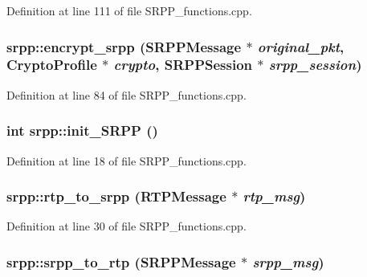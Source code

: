 Definition at line 111 of file SRPP\_\-functions.cpp.

\hypertarget{namespacesrpp_adac1bae57907c468dda2ad2e546199e8}{
\subsubsection[{encrypt\_\-srpp}]{ srpp::encrypt\_\-srpp ({\bf SRPPMessage} $\ast$ {\em original\_\-pkt}, \/  {\bf CryptoProfile} $\ast$ {\em crypto}, \/  {\bf SRPPSession} $\ast$ {\em srpp\_\-session})}}
\label{namespacesrpp_adac1bae57907c468dda2ad2e546199e8}


Definition at line 84 of file SRPP\_\-functions.cpp.

\hypertarget{namespacesrpp_a8034bd54b6c3689cea2030fc208e372c}{
\subsubsection[{init\_\-SRPP}]{\setlength{\rightskip}{0pt plus 5cm}int srpp::init\_\-SRPP ()}}
\label{namespacesrpp_a8034bd54b6c3689cea2030fc208e372c}


Definition at line 18 of file SRPP\_\-functions.cpp.

\hypertarget{namespacesrpp_a177dc3d8977584c43874f34fe0afabfc}{
\subsubsection[{rtp\_\-to\_\-srpp}]{ srpp::rtp\_\-to\_\-srpp ({\bf RTPMessage} $\ast$ {\em rtp\_\-msg})}}
\label{namespacesrpp_a177dc3d8977584c43874f34fe0afabfc}


Definition at line 30 of file SRPP\_\-functions.cpp.

\hypertarget{namespacesrpp_ace8256ed4a8da891d842dc82e9747d31}{
\subsubsection[{srpp\_\-to\_\-rtp}]{ srpp::srpp\_\-to\_\-rtp ({\bf SRPPMessage} $\ast$ {\em srpp\_\-msg})}}
\label{namespacesrpp_ace8256ed4a8da891d842dc82e9747d31}


